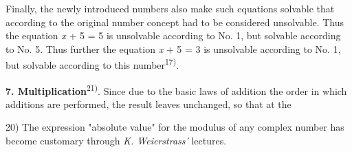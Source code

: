 Finally, the newly introduced numbers also make such equations solvable that according to the original number concept had to be considered unsolvable. Thus the equation \textit{x} + 5 = 5 is unsolvable according to No. 1, but solvable according to No. 5. Thus further the equation \textit{x} + 5 = 3 is unsolvable according to No. 1, but solvable according to this number\textsuperscript{17)}.

\textbf{7. Multiplication}\textsuperscript{21)}. Since due to the basic laws of addition the order in which additions are performed, the result leaves unchanged, so that at the 

\vfill
\leftline{\rule{2in}{0.4pt}}
\vspace{0.2cm}
{
\footnotesize
20) The expression "absolute value" for the modulus of any complex number has become customary through \textit{K. Weierstrass'} lectures.

}